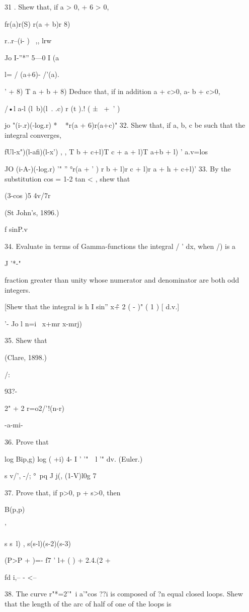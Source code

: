 31 . Shew that, if a > 0, + 6 > 0,

fr(a)r(S) r(a + b)r 8)

r..r--(i- ) \ ,, lrw

Jo I-''*'' 5—0 I (a

l= / (a+6)- /'(a).

' + 8) T a + b + 8) Deduce that, if in addition a + c>0, a- b + c>0,

/•l a-l (l\ b)(l\ . .c) r (t ).! ( ± \ +\ ' )

jo "(i-.r)(-log.r) * ~ *r(a + 6)r(a+c)" 32. Shew that, if a, b, c be
such that the integral converges,

fUl-x")(l-afi)(l-x') , , T b + c+l)T c + a + l)T a+b + l) ' a.v=los

JO (i-A-)(-log.r) '" '' °r(a + ' ) r b + l)r c + l)r a + h + c+l)' 33.
By the substitution cos = 1-2 tan < , shew that

(3-cos )5 4v/7r

(St John's, 1896.)

f sinP.v

34. Evaluate in terms of Gamma-functions the integral / ' dx, when /)
is a

J '*-"

fraction greater than unity whose numerator and denominator are both
odd integers.

[Shew that the integral is h I sin'' x\~+ 2 ( - )" ( 1 ) [ d.v.]

'- Jo l n=i \ x+mr x-mrj)

35. Shew that

(Clare, 1898.)

/:

93?-

2" + 2 r=o2/'!(n-r)

-a-mi-

36. Prove that

log Bip,g) log ( +i) 4- I ' \: '"\ \ l '" dv. (Euler.)

s v/', -/; °\ pq J j(, (1-V)l0g 7

37. Prove that, if p>0, p + s>0, then

B(p,p)

 '

s s~l) , s(s-l)(s-2)(s-3)

 (P>P + )=- f7 ' l+ ( ) + 2.4.(2 +

fd i,-- - <--

38. The curve r"*=2'"~i a'"cos ??i is composed of ?n equal closed
loops. Shew that the length of the arc of half of one of the loops is

